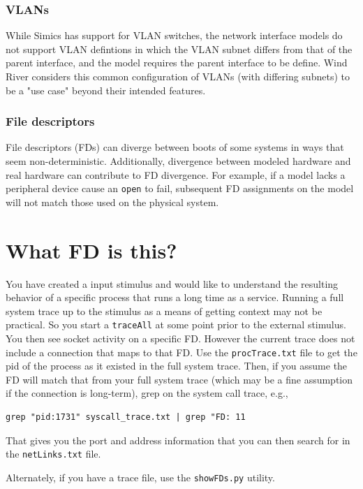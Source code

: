 \documentclass[titlepage]{article}
\begin{document}
\begin{appendices}
\subsubsection{VLANs}
While Simics has support for VLAN switches, the network interface models do not support
VLAN defintions in which the VLAN subnet differs from that of the parent interface, and the model
requires the parent interface to be define.  Wind River considers this common configuration
of VLANs (with differing subnets) to be a "use case" beyond their intended features.

\subsubsection{File descriptors}
File descriptors (FDs) can diverge between boots of some systems in ways that seem non-deterministic.
Additionally, divergence between modeled hardware and real hardware can contribute to FD divergence.
For example, if a model lacks a peripheral device cause an {\tt open} to fail, subsequent FD assignments
on the model will not match those used on the physical system.  

\section{What FD is this?}
You have created a input stimulus and would like to understand the resulting behavior of a specific process
that runs a long time as a service.
Running a full system trace up to the stimulus as a means of getting context may not be practical.  So you start
a {\tt traceAll} at some point prior to the external stimulus.  You then see socket activity on a specific FD.
However the current trace does not include a connection that maps to that FD.  Use the {\tt procTrace.txt}
file to get the pid of the process as it existed in the full system trace.  Then, if you assume the FD will match
that from your full system trace (which may be a fine assumption if the connection is long-term), grep on 
the system call trace, e.g.,
\begin{verbatim}
grep "pid:1731" syscall_trace.txt | grep "FD: 11
\end{verbatim}
That gives you the port and address information that you can then search for in the {\tt netLinks.txt} file.

Alternately, if you have a trace file, use the {\tt showFDs.py} utility.


\end{appendices}
\end{document}
